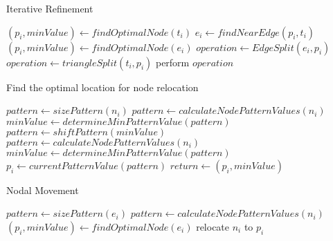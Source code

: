 \begin{algorithm}[H]
\caption{Iterative Refinement}
\label{alg_IterativeRefinement}
\begin{algorithmic}
 
    \State $\left( p_i, minValue \right) \gets findOptimalNode\left( t_i \right)$
      \State $e_i \gets findNearEdge\left( p_i, t_i \right)$
      \State $\left( p_i, minValue \right) \gets findOptimalNode\left( e_i \right)$
      \State $operation \gets EdgeSplit\left( e_i, p_i \right)$
    \Else
      \State $operation \gets triangleSplit\left( t_i, p_i \right)$
    \EndIf
      \State perform $operation$
    \EndIf
  \EndFor
\EndProcedure
\end{algorithmic}
\end{algorithm}

\begin{algorithm}
\begin{algorithmic}
\caption{Find the optimal location for node relocation}
\label{alg_NodeSmoothing}
 
  \State $pattern \gets sizePattern\left( n_i \right)$
  \State $pattern \gets calculateNodePatternValues\left( n_i \right)$
  \State $minValue \gets determineMinPatternValue\left( pattern \right)$
    \State $pattern \gets shiftPattern\left( minValue \right)$
    \State $pattern \gets calculateNodePatternValues\left( n_i \right)$
    \State $minValue \gets determineMinPatternValue\left( pattern \right)$
  \EndWhile
  \State $p_i \gets currentPatternValue\left( pattern \right)$
  \State $return \gets \left( p_i, minValue \right)$
\EndProcedure
\end{algorithmic}
\end{algorithm}

\begin{algorithm}[H]
\caption{Nodal Movement}
\begin{algorithmic}
 
    \State $pattern \gets sizePattern\left( e_i \right)$
    \State $pattern \gets calculateNodePatternValues\left( n_i \right)$
    \State $\left( p_i, minValue \right) \gets findOptimalNode\left( e_i \right)$
  \EndFor
    \State relocate $n_i$ to $p_i$
  \EndIf
\EndProcedure
\end{algorithmic}
\end{algorithm}
